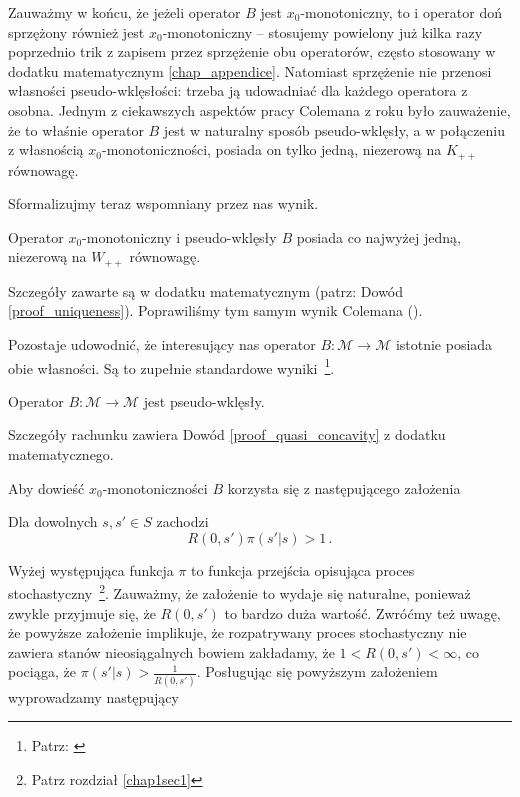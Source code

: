 Zauważmy w końcu, że jeżeli operator $B$ jest $x_0$-monotoniczny, to i operator doń sprzężony również jest $x_0$-monotoniczny -- stosujemy powielony już kilka razy poprzednio trik z zapisem przez sprzężenie obu operatorów, często stosowany w dodatku matematycznym \ref{chap_appendice}. Natomiast sprzężenie nie przenosi własności pseudo-wklęsłości: trzeba ją udowadniać dla każdego operatora z osobna. Jednym z ciekawszych aspektów pracy Colemana z \citeyear{Coleman2} roku było zauważenie, że to właśnie operator $B$ jest w naturalny sposób pseudo-wklęsły, a w połączeniu z własnością $x_0$-monotoniczności, posiada on tylko jedną, niezerową na $K_{++}$ równowagę. 

Sformalizujmy teraz wspomniany przez nas wynik. 

\begin{lemat}\label{uniqueness} 
Operator $x_0$-monotoniczny i pseudo-wklęsły $B$ posiada co najwyżej jedną, niezerową na $W_{++}$ równowagę. 
\end{lemat}

Szczegóły zawarte są w dodatku matematycznym (patrz: Dowód \ref{proof_uniqueness}). Poprawiliśmy tym samym wynik Colemana (\citeyear{Coleman2}).

Pozostaje udowodnić, że interesujący nas operator $B: \mathcal{M} \rightarrow \mathcal{M}$ istotnie posiada obie własności. Są to zupełnie standardowe wyniki~\footnote{Patrz: \citet{Coleman1, Coleman2}}.  

\begin{lemat}\label{on_pseudo_concavity_of_B}
	Operator $B: \mathcal{M} \rightarrow \mathcal{M}$ jest pseudo-wklęsły.
\end{lemat}

Szczegóły rachunku zawiera Dowód \ref{proof_quasi_concavity} z dodatku matematycznego.

Aby dowieść $x_0$-monotoniczności $B$ korzysta się z następującego założenia

\begin{ass}\label{ass on R 2} Dla dowolnych $s,s' \in S$ zachodzi
	$$R(0,s')\pi (s' | s) > 1\,. $$
\end{ass}

Wyżej występująca funkcja $\pi$ to funkcja przejścia opisująca proces stochastyczny~\footnote{Patrz rozdział \ref{chap1sec1}}. Zauważmy, że założenie to wydaje się naturalne, ponieważ zwykle przyjmuje się, że $R(0,s')$ to bardzo duża wartość. Zwróćmy też uwagę, że powyższe założenie implikuje, że rozpatrywany proces stochastyczny nie zawiera stanów nieosiągalnych bowiem zakładamy, że $1 < R(0,s') < \infty$, co pociąga, że $\pi(s'|s) > \frac{1}{R(0,s')}$. Posługując się powyższym założeniem wyprowadzamy następujący

